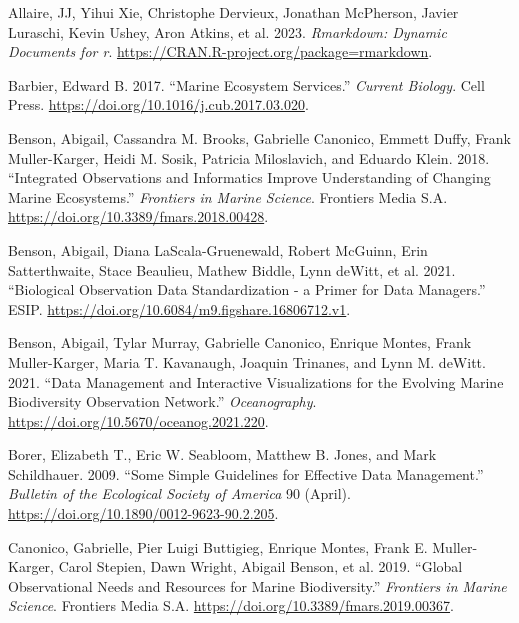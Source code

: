 \documentclass[
]{book}
\newlength{\cslhangindent}
\newlength{\cslentryspacingunit} %
\newenvironment{CSLReferences}[2] %
 {%
  \setlength{\parindent}{0pt}
  \ifodd #1
  \let\oldpar\par
  \def\par{\hangindent=\cslhangindent\oldpar}
  \fi
  \setlength{\parskip}{#2\cslentryspacingunit}
 }%
 {}
\begin{document}
\hypertarget{refs}{}
\begin{CSLReferences}{1}{0}
\leavevmode{}%
Allaire, JJ, Yihui Xie, Christophe Dervieux, Jonathan McPherson, Javier Luraschi, Kevin Ushey, Aron Atkins, et al. 2023. \emph{Rmarkdown: Dynamic Documents for r}. \url{https://CRAN.R-project.org/package=rmarkdown}.

\leavevmode{}%
Barbier, Edward B. 2017. {``Marine Ecosystem Services.''} \emph{Current Biology}. Cell Press. \url{https://doi.org/10.1016/j.cub.2017.03.020}.

\leavevmode{}%
Benson, Abigail, Cassandra M. Brooks, Gabrielle Canonico, Emmett Duffy, Frank Muller-Karger, Heidi M. Sosik, Patricia Miloslavich, and Eduardo Klein. 2018. {``Integrated Observations and Informatics Improve Understanding of Changing Marine Ecosystems.''} \emph{Frontiers in Marine Science}. Frontiers Media S.A. \url{https://doi.org/10.3389/fmars.2018.00428}.

\leavevmode{}%
Benson, Abigail, Diana LaScala-Gruenewald, Robert McGuinn, Erin Satterthwaite, Stace Beaulieu, Mathew Biddle, Lynn deWitt, et al. 2021. {``Biological Observation Data Standardization - a Primer for Data Managers.''} ESIP. \url{https://doi.org/10.6084/m9.figshare.16806712.v1}.

\leavevmode{}%
Benson, Abigail, Tylar Murray, Gabrielle Canonico, Enrique Montes, Frank Muller-Karger, Maria T. Kavanaugh, Joaquin Trinanes, and Lynn M. deWitt. 2021. {``Data Management and Interactive Visualizations for the Evolving Marine Biodiversity Observation Network.''} \emph{Oceanography}. \url{https://doi.org/10.5670/oceanog.2021.220}.

\leavevmode{}%
Borer, Elizabeth T., Eric W. Seabloom, Matthew B. Jones, and Mark Schildhauer. 2009. {``Some Simple Guidelines for Effective Data Management.''} \emph{Bulletin of the Ecological Society of America} 90 (April). \url{https://doi.org/10.1890/0012-9623-90.2.205}.

\leavevmode{}%
Canonico, Gabrielle, Pier Luigi Buttigieg, Enrique Montes, Frank E. Muller-Karger, Carol Stepien, Dawn Wright, Abigail Benson, et al. 2019. {``Global Observational Needs and Resources for Marine Biodiversity.''} \emph{Frontiers in Marine Science}. Frontiers Media S.A. \url{https://doi.org/10.3389/fmars.2019.00367}.


\end{CSLReferences}
\end{document}
